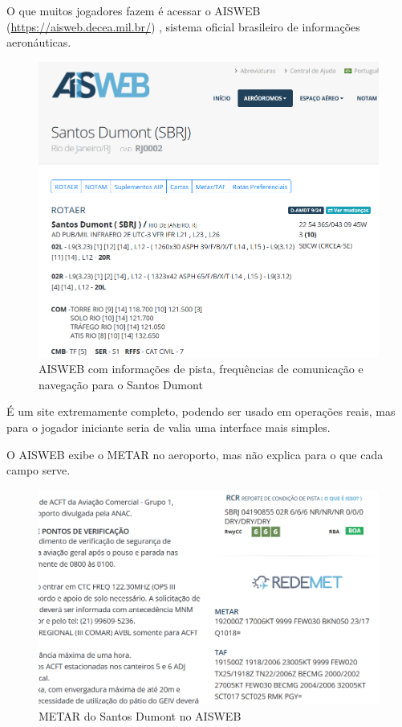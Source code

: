 O que muitos jogadores fazem é acessar o AISWEB (\url{https://aisweb.decea.mil.br/}) , sistema oficial brasileiro
de informações aeronáuticas. 

\begin{figure}[ht]
    \begin{center}
    \includegraphics[width=400pt]{img/aisweb.png}
    \caption{AISWEB com informações de pista, frequências de comunicação e navegação para o Santos Dumont}
    \label{fig:aisweb}
    \end{center}
\end{figure}

É um site extremamente completo, podendo
ser usado em operações reais, mas para o jogador iniciante seria 
de valia uma interface mais simples.

O AISWEB exibe o METAR no aeroporto, mas não explica para o que cada campo serve.

\begin{figure}[ht]
    \begin{center}
    \includegraphics[width=400pt]{img/metar-aisweb.png}
    \caption{METAR do Santos Dumont no AISWEB}
    \label{fig:aisweb}
    \end{center}
\end{figure}


